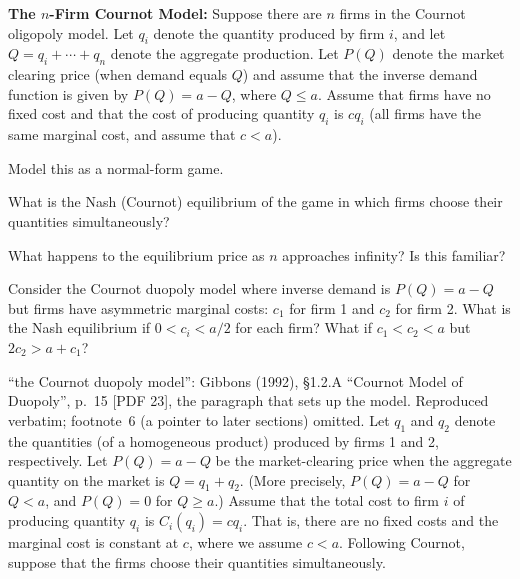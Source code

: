 \textbf{The $n$-Firm Cournot Model:} Suppose there are $n$ firms in the Cournot oligopoly
model. Let $q_i$ denote the quantity produced by firm $i$, and let $Q = q_i + \cdots + q_n$ denote
the aggregate production. Let $P(Q)$ denote the market clearing price (when demand equals $Q$) and
assume that the inverse demand function is given by $P(Q) = a - Q$, where $Q \le a$. Assume that
firms have no fixed cost and that the cost of producing quantity $q_i$ is $cq_i$ (all firms have the
same marginal cost, and assume that $c < a$).
\begin{partes}
\item Model this as a normal-form game.
\item What is the Nash (Cournot) equilibrium of the game in which firms choose their quantities
simultaneously?
\item What happens to the equilibrium price as $n$ approaches infinity? Is this familiar?
\end{partes}
\resolespaco


Consider the Cournot duopoly model where inverse demand is $P(Q) = a - Q$ but firms have
asymmetric marginal costs: $c_1$ for firm 1 and $c_2$ for firm 2. What is the Nash equilibrium if
$0 < c_i < a/2$ for each firm? What if $c_1 < c_2 < a$ but $2c_2 > a + c_1$?

\begin{referencia}{``the Cournot duopoly model'': Gibbons (1992), \S1.2.A ``Cournot Model of
Duopoly'', p.~15 [PDF 23], the paragraph that sets up the model. Reproduced verbatim; footnote~6
(a pointer to later sections) omitted.}
Let $q_1$ and $q_2$ denote the quantities (of a homogeneous product) produced by firms 1 and 2,
respectively. Let $P(Q) = a - Q$ be the market-clearing price when the aggregate quantity on the
market is $Q = q_1 + q_2$. (More precisely, $P(Q) = a - Q$ for $Q < a$, and $P(Q) = 0$ for
$Q \ge a$.) Assume that the total cost to firm $i$ of producing quantity $q_i$ is $C_i(q_i) = cq_i$.
That is, there are no fixed costs and the marginal cost is constant at $c$, where we assume
$c < a$. Following Cournot, suppose that the firms choose their quantities simultaneously.
\end{referencia}
\resolespaco

